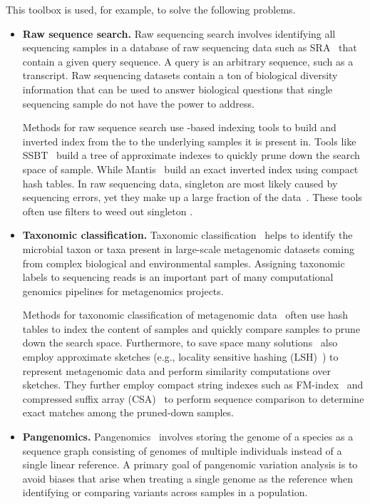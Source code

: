 This toolbox is used, for example, to solve the following problems.

\begin{itemize}[leftmargin=*]
\item {\bf Raw sequence search.} Raw sequencing search involves  identifying all sequencing samples in a database of raw sequencing data such as SRA~\cite{kodama2012sequence} that contain a given query sequence. A query is an arbitrary sequence, such as a transcript. Raw sequencing datasets contain a ton of biological diversity information that can be used to answer biological questions that single sequencing sample do not have the power to address.

Methods for raw sequence search use \kmer-based indexing tools to build and inverted index from the \kmers to the underlying samples it is present in. Tools like SSBT~\cite{SolomonKi16} build a tree of approximate \kmer indexes to quickly prune down the search space of sample. While Mantis~\cite{PandeyABFJP18Cell} build an exact inverted index using compact hash tables.
In raw sequencing data, singleton \kmers are most likely caused by sequencing errors, yet they make up a large fraction of the data~\cite{solomon2016fast,MarccaisKi11}. These tools often use filters to weed out singleton \kmers. 

\item {\bf Taxonomic classification.} Taxonomic classification~\cite{wood2014kraken} helps to identify the microbial taxon or taxa present in large-scale  metagenomic datasets coming from complex biological and environmental samples. Assigning taxonomic labels to sequencing reads is an important part of many computational genomics pipelines for metagenomics
projects.

Methods for taxonomic classification of metagenomic data~\cite{wood2014kraken} often use hash tables to index the \kmer content of samples and quickly compare samples to prune down the search space. 
Furthermore, to save space many solutions~\cite{wood2019improved} also employ approximate sketches (e.g., locality sensitive hashing (LSH)~\cite{roberts2004reducing}) to represent metagenomic data and perform similarity computations over sketches. 
They further employ compact string indexes such as FM-index~\cite{ferragina2000opportunistic} and compressed suffix array (CSA)~\cite{grossi2000compressed} to perform sequence comparison to determine exact matches among the pruned-down samples.

\item {\bf Pangenomics.}
Pangenomics~\cite{garrison2018variation} involves storing the genome of a species as a sequence graph consisting of genomes of multiple individuals instead of a single linear reference. A primary goal of pangenomic variation analysis is to avoid biases that arise when treating a single genome as the reference when identifying or comparing variants across samples in a population.


\end{itemize}
